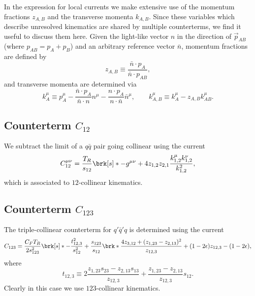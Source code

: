 \documentclass[11pt,a4paper]{article}
\newcommand{\eps}[0]{\epsilon}
\begin{document}
In the expression for local currents
we make extensive use of the momentum fractions $z_{A,B}$
and the transverse momenta $k_{A,B}$.
Since these variables which describe unresolved kinematics
are shared by multiple counterterms,
we find it useful to discuss them here.
Given the light-like vector $n$ in the direction of $\vec{p}_{AB}$
(where $p_{AB} = p_A+p_B$)
and an arbitrary reference vector $\bar{n}$,
momentum fractions are defined by
\begin{equation}
	z_{A,B} \equiv \frac{\bar{n}\cdot p_A}{\bar{n}\cdot p_{AB}},
\end{equation}
and transverse momenta are determined via
\begin{equation}
	k_A^\mu \equiv p_A^\mu
	- \frac{\bar{n}\cdot p_A}{\bar{n}\cdot n} n^\mu
	- \frac{n \cdot p_A}{n\cdot\bar{n}} \bar{n}^\mu,
	\qquad
	k_{A,B}^\mu \equiv k_A^\mu - z_{A,B} k_{AB}^\mu.
\end{equation}


\subsection{Counterterm $C_{12}$}

We subtract the limit of a $q\bar{q}$ pair going collinear using the current
\begin{equation}
\label{eq:Pqq}
	C_{12}^{\mu\nu} = \frac{T_R}{s_{12}} \brk[s]*{
		- g^{\mu\nu}
		+ 4 z_{1,2} z_{2,1} \frac{k_{1,2}^\mu k_{1,2}^\nu}{k_{1,2}^2}
	},
\end{equation}
which is associated to $12$-collinear kinematics.


\subsection{Counterterm $C_{123}$}

The triple-collinear counterterm for $q'\bar{q}'q$
is determined using the current \cite{Catani:1999ss}
\begin{equation}
	C_{123} = \frac{C_F T_R}{2 s_{123}^2} \brk[s]*{
		- \frac{t_{12,3}^2}{s_{12}^2}
		+ \frac{s_{123}}{s_{12}} \brk*{
			\frac{4 z_{3,12} + (z_{1,23} - z_{2,13})^2}{z_{12,3}}
			+(1 - 2\eps) z_{12,3}
		}
		- (1 - 2\eps)
	},
\end{equation}
where
\begin{equation}
	t_{12,3}
	\equiv 2 \frac{z_{1,23} s_{23} - z_{2,13} s_{13}}{z_{12,3}}
	+ \frac{z_{1,23} - z_{2,13}}{z_{12,3}} s_{12}.
\end{equation}
Clearly in this case we use $123$-collinear kinematics.
\end{document}
